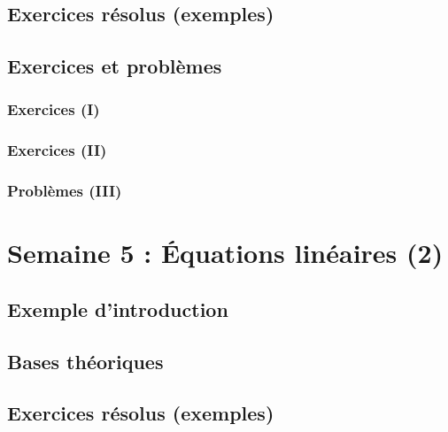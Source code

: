 \documentclass[
  12pt,
]{book}
\begin{document}
\hypertarget{exercices-ruxe9solus-exemples-3}{%
\section{Exercices résolus (exemples)}\label{exercices-ruxe9solus-exemples-3}}

\hypertarget{exercices-et-probluxe8mes-3}{%
\section{Exercices et problèmes}\label{exercices-et-probluxe8mes-3}}

\hypertarget{exercices-i-3}{%
\subsection{Exercices (I)}\label{exercices-i-3}}

\hypertarget{exercices-ii-3}{%
\subsection{Exercices (II)}\label{exercices-ii-3}}

\hypertarget{probluxe8mes-iii-3}{%
\subsection{Problèmes (III)}\label{probluxe8mes-iii-3}}

\hypertarget{semaine-5-uxe9quations-linuxe9aires-2}{%
\chapter{Semaine 5 : Équations linéaires (2)}\label{semaine-5-uxe9quations-linuxe9aires-2}}

\hypertarget{exemple-dintroduction-4}{%
\section{Exemple d'introduction}\label{exemple-dintroduction-4}}

\hypertarget{bases-thuxe9oriques-4}{%
\section{Bases théoriques}\label{bases-thuxe9oriques-4}}

\hypertarget{exercices-ruxe9solus-exemples-4}{%
\section{Exercices résolus (exemples)}\label{exercices-ruxe9solus-exemples-4}}
\end{document}
